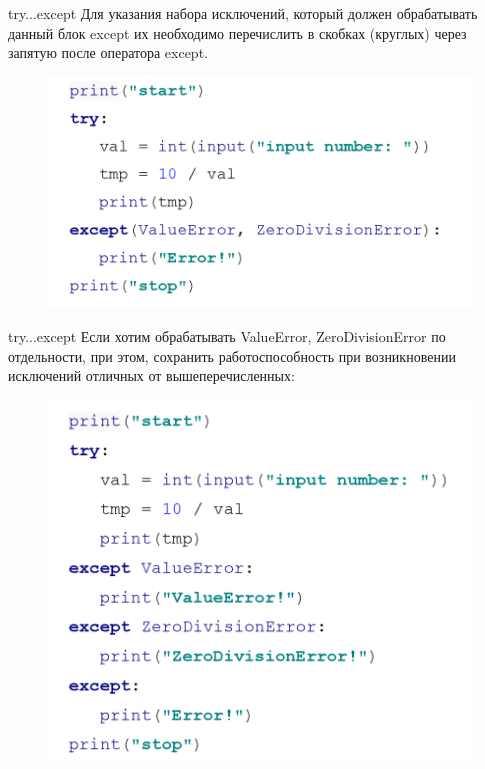 \documentclass[xcolor=table]{beamer}
\begin{document}
\begin{frame}{try...except}
	Для указания набора исключений, который должен обрабатывать данный блок except их необходимо перечислить в скобках (круглых) через запятую после оператора except.
	\begin{figure}[h]
		\centering
		\includegraphics[scale=0.7]{images/lec08-pic06-python.png}
	\end{figure}
\end{frame}

\begin{frame}{try...except}
	Если хотим обрабатывать ValueError, ZeroDivisionError по отдельности, при этом, сохранить работоспособность при возникновении исключений отличных от вышеперечисленных:
	\begin{figure}[h]
		\centering
		\includegraphics[scale=0.7]{images/lec08-pic07-python.png}
	\end{figure}
\end{frame}
\end{document}
